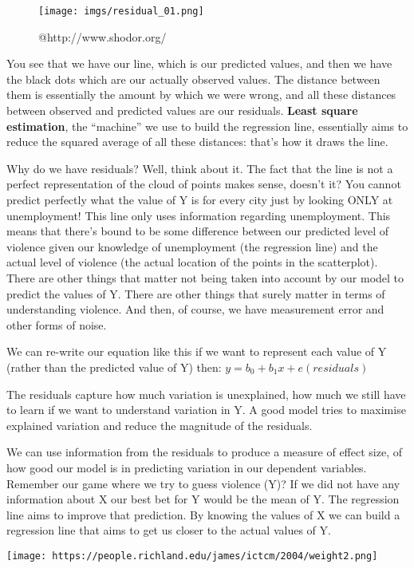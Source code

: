 \documentclass[
]{book}
\begin{document}
\begin{figure}
\centering
\texttt{[image: imgs/residual\_01.png]}
\caption{@http://www.shodor.org/}
\end{figure}

You see that we have our line, which is our predicted values, and then we have the black dots which are our actually observed values. The distance between them is essentially the amount by which we were wrong, and all these distances between observed and predicted values are our residuals. \textbf{Least square estimation}, the ``machine'' we use to build the regression line, essentially aims to reduce the squared average of all these distances: that's how it draws the line.

Why do we have residuals? Well, think about it. The fact that the line is not a perfect representation of the cloud of points makes sense, doesn't it? You cannot predict perfectly what the value of Y is for every city just by looking ONLY at unemployment! This line only uses information regarding unemployment. This means that there's bound to be some difference between our predicted level of violence given our knowledge of unemployment (the regression line) and the actual level of violence (the actual location of the points in the scatterplot). There are other things that matter not being taken into account by our model to predict the values of Y. There are other things that surely matter in terms of understanding violence. And then, of course, we have measurement error and other forms of noise.

We can re-write our equation like this if we want to represent each value of Y (rather than the predicted value of Y) then:
\(y = b_0 + b_1x + e(residuals)\)

The residuals capture how much variation is unexplained, how much we still have to learn if we want to understand variation in Y. A good model tries to maximise explained variation and reduce the magnitude of the residuals.

We can use information from the residuals to produce a measure of effect size, of how good our model is in predicting variation in our dependent variables. Remember our game where we try to guess violence (Y)? If we did not have any information about X our best bet for Y would be the mean of Y. The regression line aims to improve that prediction. By knowing the values of X we can build a regression line that aims to get us closer to the actual values of Y.

\texttt{[image: https://people.richland.edu/james/ictcm/2004/weight2.png]}
\end{document}
